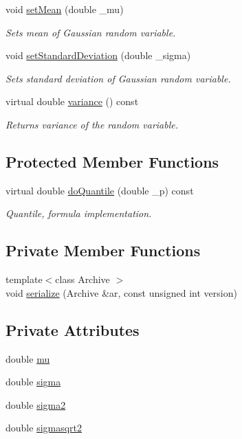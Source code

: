 \begin{DoxyCompactItemize}
void \hyperlink{class_c_gaussian_c_r_v_a2c5c76ade927d008b0cd76529ecb2b13}{set\-Mean} (double \-\_\-mu)
\begin{DoxyCompactList}\small\item\em Sets mean of Gaussian random variable. \end{DoxyCompactList}\item 
void \hyperlink{class_c_gaussian_c_r_v_a24eac186e80bae2c940d16759318944f}{set\-Standard\-Deviation} (double \-\_\-sigma)
\begin{DoxyCompactList}\small\item\em Sets standard deviation of Gaussian random variable. \end{DoxyCompactList}\item 
virtual double \hyperlink{class_c_gaussian_c_r_v_a33c7bb8ec0a32829781329d57afb7b0c}{variance} () const 
\begin{DoxyCompactList}\small\item\em Returns variance of the random variable. \end{DoxyCompactList}\end{DoxyCompactItemize}
\subsection*{Protected Member Functions}
\begin{DoxyCompactItemize}
\item 
virtual double \hyperlink{class_c_gaussian_c_r_v_a1916b8e698cb646671492e3dd6df35d8}{do\-Quantile} (double \-\_\-p) const 
\begin{DoxyCompactList}\small\item\em Quantile, formula implementation. \end{DoxyCompactList}\end{DoxyCompactItemize}
\subsection*{Private Member Functions}
\begin{DoxyCompactItemize}
\item 
{\footnotesize template$<$class Archive $>$ }\\void \hyperlink{class_c_gaussian_c_r_v_affecbdbf14e499a8c7777979181b2008}{serialize} (Archive \&ar, const unsigned int version)
\end{DoxyCompactItemize}
\subsection*{Private Attributes}
\begin{DoxyCompactItemize}
\item 
double \hyperlink{class_c_gaussian_c_r_v_a513c769a9aa18c47a07713f50d1a0fd8}{mu}
\item 
double \hyperlink{class_c_gaussian_c_r_v_a52b3c6dc416103587cfe07ffb7a914bd}{sigma}
\item 
double \hyperlink{class_c_gaussian_c_r_v_aa6e20834bdd6a1e47bdb5b39d8a2e23f}{sigma2}
\item 
double \hyperlink{class_c_gaussian_c_r_v_a8959054f1098f9254c75d736245bb60b}{sigmasqrt2}
\end{DoxyCompactItemize}

